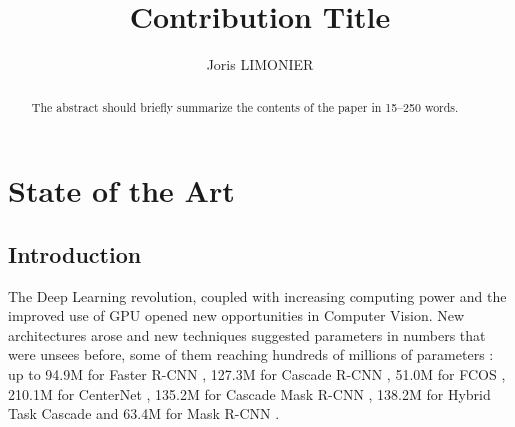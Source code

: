 \documentclass[runningheads]{llncs}
\begin{document}
\title{Contribution Title}

\author{Joris LIMONIER}
%
%
%
\maketitle              %
%
\begin{abstract}
  The abstract should briefly summarize the contents of the paper in
  15--250 words.

\end{abstract}


\section{State of the Art}
\subsection{Introduction}
The Deep Learning revolution, coupled with increasing computing power and the improved use of GPU opened new opportunities in Computer Vision. New architectures arose and new techniques suggested parameters in numbers that were unsees before, some of them reaching hundreds of millions of parameters \cite{hrnet}: up to 94.9M for Faster R-CNN \cite{R-CNN}, 127.3M for Cascade R-CNN \cite{Cascade R-CNN}, 51.0M for FCOS \cite{FCOS}, 210.1M for CenterNet \cite{CenterNet}, 135.2M for Cascade Mask R-CNN \cite{Cascade R-CNN}, 138.2M for Hybrid Task Cascade \cite{Hybrid Task Cascade} and 63.4M for Mask R-CNN \cite{R-CNN}.
\end{document}
